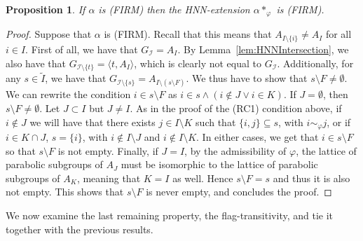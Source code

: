\documentclass[11pt,letterpaper]{amsart}
\newtheorem{prop}{Proposition}[section]
\newcommand{\II}{\mathcal{I}}
\begin{document}
\begin{prop}\label{prop:HNNFIRM}
    If $\alpha$ is (FIRM) then the HNN-extension $\alpha*_\varphi$ is (FIRM).
\end{prop}
\begin{proof}
    Suppose that $\alpha$ is (FIRM). Recall that this means that $A_{I\setminus\{i\}}\neq A_I$ for all $i\in I$.
    First of all, we have that $G_\II = A_I$. By Lemma~\ref{lem:HNNIntersection}, we also have that $G_{\II\setminus \{t\}} = \langle t, A_I\rangle$, which is clearly not equal to $G_\II$. Additionally, for any $s\in \widetilde{I}$, we have that $G_{\II\setminus\{s\}} = A_{I\setminus (s\setminus F)}$. We thus have to show that $s\setminus F\neq \emptyset$. We can rewrite the condition $i\in s\setminus F$ as $i\in s\wedge (i\notin J\vee i\in K)$.  If $J=\emptyset$, then $s\setminus F\neq \emptyset$. Let $J\subset I$ but $J\neq I$. As in the proof of the (RC1) condition above, if $i\notin J$ we will have that there exists $j\in I\setminus K$ such that $\{i,j\}\subseteq s$, with $i\sim_{\varphi}j$, or if $i\in K\cap J$, $s=\{i\} $, with $i\notin I\setminus J$ and $i\notin I\setminus K$. In either cases, we get that $i\in s\setminus F$ so that $s \setminus F$ is not empty. Finally, if $J= I$, by the admissibility of $\varphi$, the lattice of parabolic subgroups of $A_J$ must be isomorphic to the lattice of parabolic subgroups of $A_K$, meaning that $K=I$ as well. Hence $s\setminus F = s$ and thus it is also not empty. This shows that $s \setminus F$ is never empty, and concludes the proof.

\end{proof}

We now examine the last remaining property, the flag-transitivity, and tie it together with the previous results.
\end{document}
